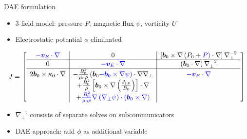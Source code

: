 \documentclass{beamer}
\newcommand\vvec{\bm v}
\newcommand\bvec{\bm b}
\newcommand\bxk{\bvec_0 \times \kappa_0 \cdot \nabla}
\newcommand\delp{\nabla_\perp}
\begin{document}
\begin{frame}{DAE formulation}
  \begin{itemize}
  \item 3-field model: pressure $P$, magnetic flux $\psi$, vorticity $U$
  \item Electrostatic potential $\phi$ eliminated
  \end{itemize}
  \begin{equation*}
    J =
    \left[ \begin{array}{c|c|c}
        \color{blue}{-\vvec_E\cdot\nabla} & 0 & \left[\bvec_0\times\nabla\left(P_0 + \color{blue}{P}\right)\cdot\nabla\right]\nabla_\perp^{-2} \\
        \hline
        0 & \color{blue}{-\vvec_E\cdot\nabla} & \left(\bvec_0\cdot\nabla\right)\nabla_\perp^{-2}  \\
        \hline
        2\bxk  & -\frac{B_0^2}{\mu_0\rho}\left(\bvec_0 \color{blue}{-\bvec_0\times\nabla\psi}\right)\cdot\nabla\delp  & \color{blue}{-\vvec_E\cdot\nabla} \\
        & + \frac{B_0^2}{\rho}\left[\bvec_0\times\nabla\left(\frac{J_{||0}}{B_0}\right)\right]\cdot\nabla & \\
        & + \color{blue}{\frac{B_0^2}{\mu_0\rho}\nabla\left(\delp\psi\right)\cdot\left(\bvec_0\times\nabla\right)} &
      \end{array}\right]
  \end{equation*}
  \begin{itemize}
  \item $\nabla_\perp^{-1}$ consists of separate solves on subcommunicators
  \item DAE approach: add $\phi$ as additional variable
  \end{itemize}
\end{frame}
\end{document}
